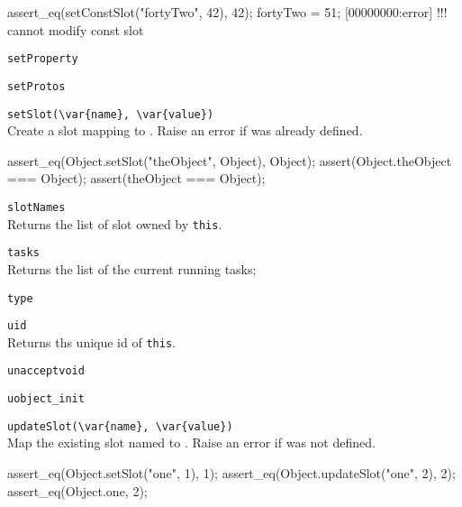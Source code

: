 \begin{itemize}
\begin{urbiscript}[firstnumber=last]
\begin{urbiscript}[firstnumber=last]
assert_eq(setConstSlot("fortyTwo", 42), 42);
fortyTwo = 51;
[00000000:error] !!! cannot modify const slot
\end{urbiscript}

\item \lstinline|setProperty|\\

\item \lstinline|setProtos|\\

\item \lstinline|setSlot(\var{name}, \var{value})|\\
  Create a slot  mapping to . Raise an error if
   was already defined.

\begin{urbiscript}[firstnumber=last]
assert_eq(Object.setSlot("theObject", Object), Object);
assert(Object.theObject === Object);
assert(theObject === Object);
\end{urbiscript}

\item \lstinline|slotNames|\\
  Returns the list of slot owned by \lstinline|this|.

\item \lstinline|tasks|\\
  Returns the list of the current running tasks;

\item \lstinline|type|\\

\item \lstinline|uid|\\
  Returns ths unique id of \lstinline|this|.

\item \lstinline|unacceptvoid|\\

\item \lstinline|uobject_init|\\

\item \lstinline|updateSlot(\var{name}, \var{value})|\\
  Map the existing slot named  to . Raise an
  error if  was not defined.
\begin{urbiscript}[firstnumber=last]
assert_eq(Object.setSlot("one", 1), 1);
assert_eq(Object.updateSlot("one", 2), 2);
assert_eq(Object.one, 2);
\end{urbiscript}


\end{urbiscript}
\end{itemize}
